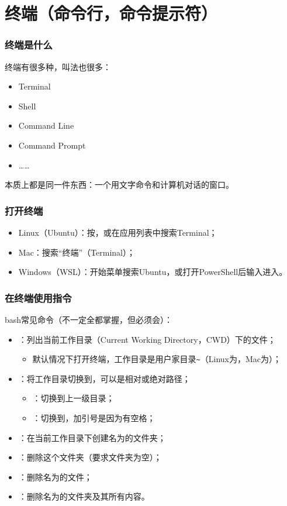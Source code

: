 \section{终端（命令行，命令提示符）}

\begin{frame}
    \frametitle{终端是什么}
    终端有很多种，叫法也很多：
    \begin{itemize}
        \item Terminal
        \item Shell
        \item Command Line
        \item Command Prompt
        \item ……
    \end{itemize}
    本质上都是同一件东西：一个用文字命令和计算机对话的窗口。
\end{frame}

\begin{frame}
    \frametitle{打开终端}
    \begin{itemize}
        \item \alert{Linux（Ubuntu）}：按，或在应用列表中搜索Terminal；
        \item \alert{Mac}：搜索“终端”（Terminal）；
        \item \alert{Windows（WSL）}：开始菜单搜索Ubuntu，或打开PowerShell后输入进入。
    \end{itemize}
\end{frame}

\begin{frame}
    \frametitle{在终端使用指令}
    bash常见命令（不一定全都掌握，但必须会）：
    \begin{itemize}
        \item {}：列出当前工作目录（Current Working Directory，CWD）下的文件；
        \begin{itemize}
            \item 默认情况下打开终端，工作目录是用户家目录\texttt{\textasciitilde{}}（Linux为，Mac为）；
        \end{itemize}
        \item {}：将工作目录切换到，可以是相对或绝对路径；
        \begin{itemize}
            \item {}：切换到上一级目录；
            \item {}：切换到，加引号是因为有空格；
        \end{itemize}
        \item {}：在当前工作目录下创建名为的文件夹；
        \item {}：删除这个文件夹（要求文件夹为空）；
        \item {}：删除名为的文件；
        \item {}：删除名为的文件夹及其所有内容。
    \end{itemize}
\end{frame}

